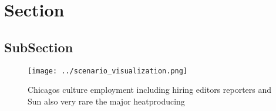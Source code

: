 \documentclass[a4paper]{article}
\begin{document}
\section{Section}

\subsection{SubSection}

\begin{figure}
\centering
\texttt{[image: ../scenario\_visualization.png]}
\caption{Chicagos culture employment including hiring editors reporters and Sun also very rare the major heatproducing
}
\end{figure}
 
\end{document}
